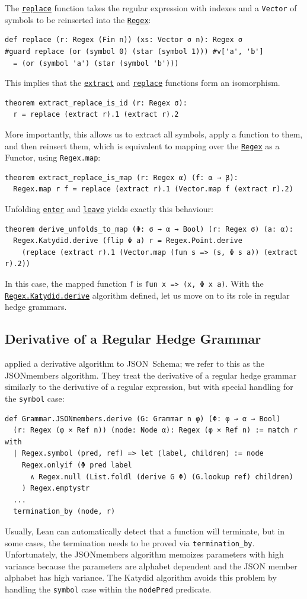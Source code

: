 \documentclass[acmsmall,%
  screen,%
  authorversion, %
  nonacm%
]{acmart}
\newcommand{\link}[2]{\mbox{\hyperref[#2]{\lstinline{#1}}}\xspace}
\newcommand{\Regex}{\link{Regex}{Regex}}
\newcommand{\RegexKatydidDerive}{\link{Regex.Katydid.derive}{def Regex.Katydid.derive}}
\newcommand{\enter}{\link{enter}{def enter}}
\newcommand{\leave}{\link{leave}{def leave}}
\newcommand{\extract}{\link{extract}{def extract}}
\newcommand{\replace}{\link{replace}{def replace}}
\newcommand{\Lean}{%
  Lean\xspace%
}
\newcommand{\JSON}{\ac{JSON}\xspace}
\begin{document}
The \replace function takes the regular expression with indexes and a \lstinline{Vector} of symbols to be reinserted into the \Regex:
\begin{lstlisting}[label=def replace]
def replace (r: Regex (Fin n)) (xs: Vector σ n): Regex σ
#guard replace (or (symbol 0) (star (symbol 1))) #v['a', 'b']
  = (or (symbol 'a') (star (symbol 'b')))
\end{lstlisting}
This implies that the \extract and \replace functions form an isomorphism. 
\begin{lstlisting}[label=theorem extract_replace_is_id]
theorem extract_replace_is_id (r: Regex σ):
  r = replace (extract r).1 (extract r).2
\end{lstlisting}
More importantly, this allows us to extract all symbols, apply a function to them, and then reinsert them, which is equivalent to mapping over the \Regex as a Functor, using \lstinline{Regex.map}:
\begin{lstlisting}[label=theorem extract_replace_is_map]
theorem extract_replace_is_map (r: Regex α) (f: α → β):
  Regex.map r f = replace (extract r).1 (Vector.map f (extract r).2)
\end{lstlisting}
Unfolding \enter and \leave yields exactly this behaviour:
\begin{lstlisting}
theorem derive_unfolds_to_map (Φ: σ → α → Bool) (r: Regex σ) (a: α):
  Regex.Katydid.derive (flip Φ a) r = Regex.Point.derive
    (replace (extract r).1 (Vector.map (fun s => (s, Φ s a)) (extract r).2))
\end{lstlisting}
In this case, the mapped function \lstinline{f} is \lstinline{fun x => (x, Φ x a)}.
With the \RegexKatydidDerive algorithm defined, let us move on to its role in regular hedge grammars.

\subsection{Derivative of a Regular Hedge Grammar}

\citet{holstege2019application} applied a derivative algorithm to JSON~Schema; we refer to this as the JSONmembers algorithm.
They treat the derivative of a regular hedge grammar similarly to the derivative of a regular expression, but with special handling for the \lstinline{symbol} case:
\begin{lstlisting}[label=def Grammar.JSONmembers.derive]
def Grammar.JSONmembers.derive (G: Grammar n φ) (Φ: φ → α → Bool)
  (r: Regex (φ × Ref n)) (node: Node α): Regex (φ × Ref n) := match r with
  | Regex.symbol (pred, ref) => let ⟨label, children⟩ := node
    Regex.onlyif (Φ pred label
      ∧ Regex.null (List.foldl (derive G Φ) (G.lookup ref) children)
    ) Regex.emptystr
  ...
  termination_by (node, r)
\end{lstlisting}
Usually, \Lean can automatically detect that a function will terminate, but in some cases, the termination needs to be proved via \lstinline{termination_by}.
Unfortunately, the JSONmembers algorithm memoizes parameters with high variance because the parameters are alphabet dependent and the \JSON member alphabet has high variance.
The Katydid algorithm avoids this problem by handling the \lstinline{symbol} case within the \lstinline{nodePred} predicate.
\end{document}
